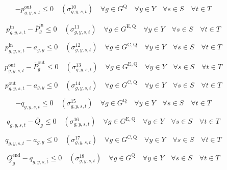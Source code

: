 \documentclass{article}
\newcommand{\sStorage}{G^{\mathrm{Q}}}
\newcommand{\sStorageExisting}{G^{\mathrm{E,Q}}}
\newcommand{\sStorageCandidate}{G^{\mathrm{C,Q}}}
\newcommand{\sYears}{Y}
\newcommand{\sScenarios}{S}
\newcommand{\sIntervals}{T}
\newcommand{\iGenerator}{g}
\newcommand{\iYear}{y}
\newcommand{\iScenario}{s}
\newcommand{\iInterval}{t}
\newcommand{\iIntervalTerminal}{\overline{\iInterval}}
\newcommand{\cPowerChargingMax}[1][\iGenerator]{\overline{P}^{\mathrm{in}}_{#1}}
\newcommand{\cPowerDischargingMax}[1][\iGenerator]{\overline{P}^{\mathrm{out}}_{#1}}
\newcommand{\cStorageUnitEnergyMax}[1][\iGenerator]{\overline{Q}_{#1}}
\newcommand{\cStorageUnitEnergyIntervalEndMin}[1][\iGenerator]{\underline{Q}^{\mathrm{end}}_{#1}}
\newcommand{\vPowerIn}[1][\iGenerator,\iYear,\iScenario,\iInterval]{p^{\mathrm{in}}_{#1}}
\newcommand{\vPowerOut}[1][\iGenerator,\iYear,\iScenario,\iInterval]{p^{\mathrm{out}}_{#1}}
\newcommand{\vStorageUnitEnergy}[1][\iGenerator,\iYear,\iScenario,\iInterval]{q_{#1}}
\newcommand{\vInstalledCapacityTotal}[1][\iGenerator,\iYear]{a_{#1}}
\newcommand{\dNonNegativeDischarging}[1][\iGenerator,\iYear,\iScenario,\iInterval]{\sigma_{#1}^{10}}
\newcommand{\dMaxChargingRateExisting}[1][\iGenerator,\iYear,\iScenario,\iInterval]{\sigma_{#1}^{11}}
\newcommand{\dMaxChargingRateCandidate}[1][\iGenerator,\iYear,\iScenario,\iInterval]{\sigma_{#1}^{12}}
\newcommand{\dMaxDischargingRateExisting}[1][\iGenerator,\iYear,\iScenario,\iInterval]{\sigma_{#1}^{13}}
\newcommand{\dMaxDischargingRateCandidate}[1][\iGenerator,\iYear,\iScenario,\iInterval]{\sigma_{#1}^{14}}
\newcommand{\dNonNegativeStorageEnergy}[1][\iGenerator,\iYear,\iScenario,\iInterval]{\sigma_{#1}^{15}}
\newcommand{\dMaxStorageEnergyExisting}[1][\iGenerator,\iYear,\iScenario,\iInterval]{\sigma_{#1}^{16}}
\newcommand{\dMaxStorageEnergyCandidate}[1][\iGenerator,\iYear,\iScenario,\iInterval]{\sigma_{#1}^{17}}
\newcommand{\dMinStorageEnergyIntervalEnd}[1][\iGenerator,\iYear,\iScenario,\iInterval]{\sigma_{#1}^{18}}
\newcommand{\sScenarioSets}{\quad \forall \iYear \in \sYears \quad \forall \iScenario \in \sScenarios \quad \forall \iInterval \in \sIntervals}
\begin{document}
\begin{equation}
	-\vPowerOut \leq 0 \quad (\dNonNegativeDischarging) \quad \forall \iGenerator \in \sStorage \sScenarioSets
\end{equation}

\begin{equation}
	\vPowerIn - \cPowerChargingMax \leq 0 \quad (\dMaxChargingRateExisting) \quad \forall \iGenerator \in \sStorageExisting \sScenarioSets
\end{equation}

\begin{equation}
	\vPowerIn - \vInstalledCapacityTotal \leq 0 \quad (\dMaxChargingRateCandidate) \quad \forall \iGenerator \in \sStorageCandidate \sScenarioSets
\end{equation}

\begin{equation}
	\vPowerOut - \cPowerDischargingMax \leq 0 \quad (\dMaxDischargingRateExisting) \quad \forall \iGenerator \in \sStorageExisting \sScenarioSets
\end{equation}

\begin{equation}
	\vPowerOut - \vInstalledCapacityTotal \leq 0 \quad (\dMaxDischargingRateCandidate) \quad \forall \iGenerator \in \sStorageCandidate \sScenarioSets
\end{equation}

\begin{equation}
	- \vStorageUnitEnergy \leq 0 \quad (\dNonNegativeStorageEnergy) \quad \forall \iGenerator \in \sStorage \sScenarioSets
\end{equation}

\begin{equation}
	\vStorageUnitEnergy - \cStorageUnitEnergyMax \leq 0 \quad (\dMaxStorageEnergyExisting) \quad \forall \iGenerator \in \sStorageExisting \sScenarioSets
\end{equation}

\begin{equation}
	\vStorageUnitEnergy - \vInstalledCapacityTotal \leq 0 \quad (\dMaxStorageEnergyCandidate) \quad \forall \iGenerator \in \sStorageCandidate \sScenarioSets
\end{equation}

\begin{equation}
	\cStorageUnitEnergyIntervalEndMin - \vStorageUnitEnergy[\iGenerator,\iYear,\iScenario,\iIntervalTerminal]\leq  0 \quad (\dMinStorageEnergyIntervalEnd) \quad \forall \iGenerator \in \sStorage \sScenarioSets
\end{equation}
\end{document}
